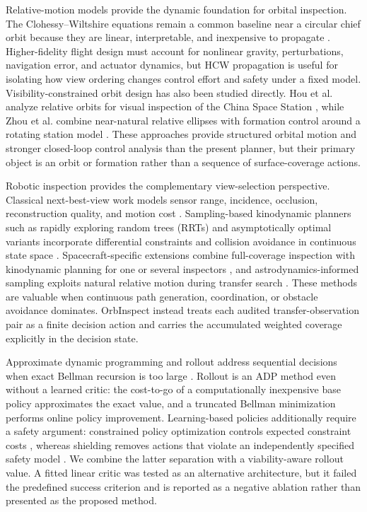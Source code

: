 \documentclass{IEEEtaes}
\theoremstyle{remark}
\theoremstyle{plain}
\begin{document}
Relative-motion models provide the dynamic foundation for orbital inspection. The Clohessy--Wiltshire equations remain a common baseline near a circular chief orbit because they are linear, interpretable, and inexpensive to propagate \cite{clohessy1960terminal,wertz2011space}. Higher-fidelity flight design must account for nonlinear gravity, perturbations, navigation error, and actuator dynamics, but HCW propagation is useful for isolating how view ordering changes control effort and safety under a fixed model. Visibility-constrained orbit design has also been studied directly. Hou et al. analyze relative orbits for visual inspection of the China Space Station \cite{hou2024relative}, while Zhou et al. combine near-natural relative ellipses with formation control around a rotating station model \cite{zhou2026formation}. These approaches provide structured orbital motion and stronger closed-loop control analysis than the present planner, but their primary object is an orbit or formation rather than a sequence of surface-coverage actions.

Robotic inspection provides the complementary view-selection perspective. Classical next-best-view work models sensor range, incidence, occlusion, reconstruction quality, and motion cost \cite{scott2003view}. Sampling-based kinodynamic planners such as rapidly exploring random trees (RRTs) and asymptotically optimal variants incorporate differential constraints and collision avoidance in continuous state space \cite{lavalle1998rapidly,karaman2011sampling}. Spacecraft-specific extensions combine full-coverage inspection with kinodynamic planning for one or several inspectors \cite{faghihi2022kinodynamic,faghihi2023multiple}, and astrodynamics-informed sampling exploits natural relative motion during transfer search \cite{deka2023astrodynamics}. These methods are valuable when continuous path generation, coordination, or obstacle avoidance dominates. OrbInspect instead treats each audited transfer-observation pair as a finite decision action and carries the accumulated weighted coverage explicitly in the decision state.

Approximate dynamic programming and rollout address sequential decisions when exact Bellman recursion is too large \cite{bertsekas2020rollout,bertsekas1996neuro}. Rollout is an ADP method even without a learned critic: the cost-to-go of a computationally inexpensive base policy approximates the exact value, and a truncated Bellman minimization performs online policy improvement. Learning-based policies additionally require a safety argument: constrained policy optimization controls expected constraint costs \cite{achiam2017cpo}, whereas shielding removes actions that violate an independently specified safety model \cite{alshiekh2018shielding}. We combine the latter separation with a viability-aware rollout value. A fitted linear critic was tested as an alternative architecture, but it failed the predefined success criterion and is reported as a negative ablation rather than presented as the proposed method.
\end{document}
